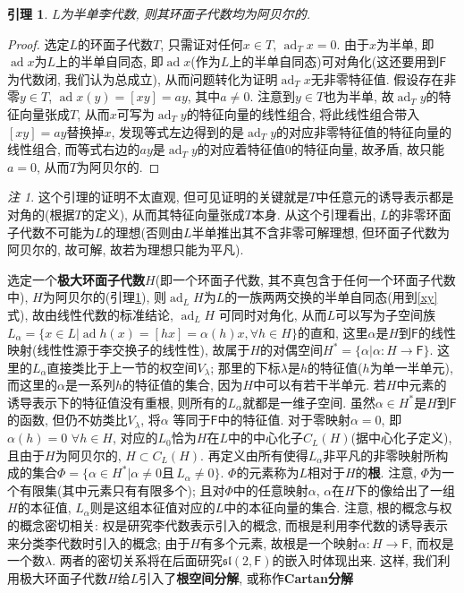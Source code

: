 \documentclass{ctexart}%
\newtheorem{lemma}{引理}
\theoremstyle{definition}
\theoremstyle{remark}
\newtheorem{remark}{注}
\DeclareMathOperator{\ad}{ad}
\begin{document}
\begin{lemma}\label{8.1}
$L$为半单李代数, 则其环面子代数均为阿贝尔的.
\end{lemma}
\begin{proof}
选定$L$的环面子代数$T$, 只需证对任何$x\in T$, $\ad _Tx=0$. 由于$x$为半单, 即$\ad x$为$L$上的半单自同态, 即$\ad x$(作为$L$上的半单自同态)可对角化(这还要用到$\mathsf{F}$为代数闭, 我们认为总成立), 从而问题转化为证明$\ad_Tx$无非零特征值. 假设存在非零$y\in T$, $\ad x(y)=[xy]=ay$, 其中$a\neq 0$. 注意到$y\in T$也为半单, 故$\ad_T y$的特征向量张成$T$, 从而$x$可写为$\ad_T y$的特征向量的线性组合, 将此线性组合带入$[xy]=ay$替换掉$x$, 发现等式左边得到的是$\ad_T y$的对应非零特征值的特征向量的线性组合, 而等式右边的$ay$是$\ad_T y$的对应着特征值0的特征向量, 故矛盾, 故只能$a=0$, 从而$T$为阿贝尔的.
\end{proof}
\begin{remark}
这个引理的证明不太直观, 但可见证明的关键就是$T$中任意元的诱导表示都是对角的(根据$T$的定义), 从而其特征向量张成$T$本身.
从这个引理看出, $L$的非零环面子代数不可能为$L$的理想(否则由$L$半单推出其不含非零可解理想, 但环面子代数为阿贝尔的, 故可解, 故若为理想只能为平凡).
\end{remark}
选定一个\textbf{极大环面子代数}$H$(即一个环面子代数, 其不真包含于任何一个环面子代数中), $H$为阿贝尔的(引理\ref{8.1}), 则$\ad _LH$为$L$的一族两两交换的半单自同态(用到\eqref{xy}式), 故由线性代数的标准结论, $\ad _LH$ 可同时对角化, 从而$L$可以写为子空间族$L_\alpha=\{x\in L| \ad h(x)=[hx]=\alpha(h)x,\forall h\in H\}$的直和, 这里$\alpha$是$H$到$\mathsf{F}$的线性映射(线性性源于李交换子的线性性), 故属于$H$的对偶空间$H^*=\{\alpha|\alpha:H\rightarrow \mathsf{F}\}$. 这里的$L_\alpha$直接类比于上一节的权空间$V_\lambda$; 那里的下标$\lambda$是$h$的特征值($h$为单一半单元), 而这里的$\alpha$是一系列$h$的特征值的集合, 因为$H$中可以有若干半单元. 若$H$中元素的诱导表示下的特征值没有重根, 则所有的$L_\alpha$就都是一维子空间. 虽然$\alpha\in H^*$是$H$到$\mathsf{F}$的函数, 但仍不妨类比$V_\lambda$, 将$\alpha$ 等同于$\mathsf{F}$中的特征值. 对于零映射$\alpha=0$, 即$\alpha(h)=0$ $\forall h\in H$, 对应的$L_0$恰为$H$在$L$中的中心化子$C_L(H)$(据中心化子定义), 且由于$H$为阿贝尔的, $H\subset C_L(H)$. 再定义由所有使得$L_\alpha$非平凡的非零映射所构成的集合$\Phi=\{ \alpha \in H^*| \alpha\neq 0\text{且}\, L_\alpha \neq 0\}$. $\Phi$的元素称为$L$相对于$H$的\textbf{根}. 注意, $\Phi$为一个有限集(其中元素只有有限多个); 且对$\Phi$中的任意映射$\alpha$, $\alpha$在$H$下的像给出了一组$H$的本征值, $L_\alpha$则是这组本征值对应的$L$中的本征向量的集合. 注意, 根的概念与权的概念密切相关: 权是研究李代数表示引入的概念, 而根是利用李代数的诱导表示来分类李代数时引入的概念; 由于$H$有多个元素, 故根是一个映射$\alpha \colon H\rightarrow \mathsf{F}$, 而权是一个数$\lambda$. 两者的密切关系将在后面研究$\mathfrak{sl}(2,\mathsf{F})$的嵌入时体现出来. 这样, 我们利用极大环面子代数$H$给$L$引入了\textbf{根空间分解}, 或称作\textbf{Cartan分解}
\end{document}
